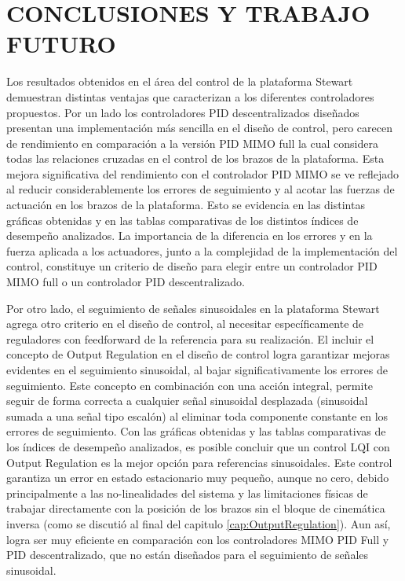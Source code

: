 \chapter{CONCLUSIONES Y TRABAJO FUTURO}
\label{cap:Conclusiones}

Los resultados obtenidos en el área del control de la plataforma Stewart demuestran distintas ventajas que caracterizan a los diferentes controladores propuestos. Por un lado los controladores PID descentralizados diseñados presentan una implementación más sencilla en el diseño de control, pero carecen de rendimiento en comparación a la versión PID MIMO full la cual considera todas las relaciones cruzadas en el control de los brazos de la plataforma. Esta mejora significativa del rendimiento con el controlador PID MIMO se ve reflejado al reducir considerablemente los errores de seguimiento y al acotar las fuerzas de actuación en los brazos de la plataforma. Esto se evidencia en las distintas gráficas obtenidas y en las tablas comparativas de los distintos índices de desempeño analizados. La importancia de la diferencia en los errores y en la fuerza aplicada a los actuadores, junto a la complejidad de la implementación del control, constituye un criterio de diseño para elegir entre un controlador PID MIMO full o un controlador PID descentralizado.

Por otro lado, el seguimiento de señales sinusoidales en la plataforma Stewart agrega otro criterio en el diseño de control, al necesitar específicamente de reguladores con feedforward de la referencia para su realización. El incluir el concepto de Output Regulation en el diseño de control logra garantizar mejoras evidentes en el seguimiento sinusoidal, al bajar significativamente los errores de seguimiento. Este concepto en combinación con una acción integral, permite seguir de forma correcta a cualquier señal sinusoidal desplazada (sinusoidal sumada a una señal tipo escalón) al eliminar toda componente constante en los errores de seguimiento. Con las gráficas obtenidas y las tablas comparativas de los índices de desempeño analizados, es posible concluir que un control LQI con Output Regulation es la mejor opción para referencias sinusoidales. Este control garantiza un error en estado estacionario muy pequeño, aunque no cero, debido principalmente a las no-linealidades del sistema y las limitaciones físicas de trabajar directamente con la posición de los brazos sin el bloque de cinemática inversa (como se discutió al final del capitulo \ref{cap:OutputRegulation}). Aun así, logra ser muy eficiente en comparación con los controladores MIMO PID Full y PID descentralizado, que no están diseñados para el seguimiento de señales sinusoidal. \\


